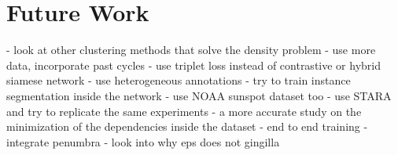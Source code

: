 \chapter{Future Work}
\label{capitolo9}
\thispagestyle{empty}
- look at other clustering methods that solve the density problem
- use more data, incorporate past cycles
- use triplet loss instead of contrastive or hybrid siamese network
- use heterogeneous annotations
- try to train instance segmentation inside the network
- use NOAA sunspot dataset too
- use STARA and try to replicate the same experiments
- a more accurate study on the minimization of the dependencies inside the dataset
- end to end training
- integrate penumbra
- look into why eps does not gingilla 

